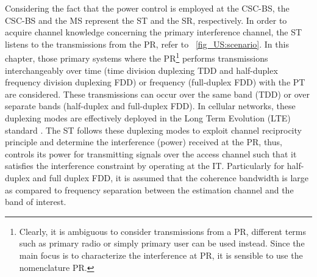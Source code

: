 Considering the fact that the power control is employed at the CSC-BS, the CSC-BS and the MS represent the ST and the SR, respectively. In order to acquire channel knowledge concerning the primary interference channel, the ST listens to the transmissions from the PR, refer to \figurename~\ref{fig_US:scenario}. In this chapter, those primary systems where the PR\footnote{Clearly, it is ambiguous to consider transmissions from a PR, different terms such as primary radio or simply primary user can be used instead. Since the main focus is to characterize the interference at PR, it is sensible to use the nomenclature PR.} performs transmissions interchangeably over time (time division duplexing TDD and half-duplex frequency division duplexing FDD) or frequency (full-duplex FDD) with the PT are considered. These transmissions can occur over the same band (TDD) or over separate bands (half-duplex and full-duplex FDD). 
In cellular networks, these duplexing modes are effectively deployed in the Long Term Evolution (LTE) standard \cite{LTE09}. The ST follows these duplexing modes to exploit channel reciprocity principle and determine the interference (power) received at the PR, thus, controls its power for transmitting signals over the access channel such that it satisfies the interference constraint by operating at the IT. Particularly for half-duplex and full duplex FDD, it is assumed that the coherence bandwidth is large as compared to frequency separation between the estimation channel and the band of interest. 
